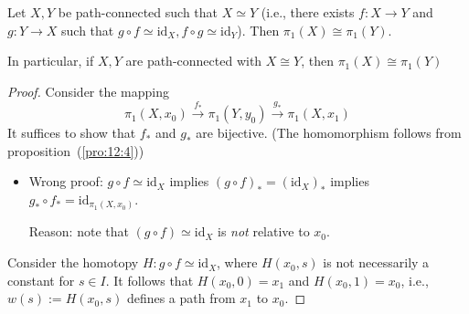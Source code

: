 \begin{proposition}\label{pro:12:5}
Let $X,Y$ be path-connected such that $X\simeq Y$ (i.e., there exists $f:X\to Y$ and $g:Y\to X$ such that $g\circ f\simeq\text{id}_X,f\circ g\simeq\text{id}_Y$).
Then $\pi_1(X)\cong\pi_1(Y)$.

In particular, if $X,Y$ are path-connected with $X\cong Y$, then $\pi_1(X)\cong\pi_1(Y)$
\end{proposition}
\begin{proof}
Consider the mapping
\[
\pi_1(X,x_0)\xrightarrow{f_*}\pi_1(Y,y_0)\xrightarrow{g_*}
\pi_1(X,x_1)
\]
It suffices to show that $f_*$ and $g_*$ are bijective. (The homomorphism follows from proposition~(\ref{pro:12:4}))
\begin{itemize}
\item
Wrong proof: $g\circ f\simeq\text{id}_X$ implies $(g\circ f)_*=(\text{id}_X)_*$ implies $g_*\circ f_*=\text{id}_{\pi_1(X,x_0)}$.

Reason: note that $(g\circ f)\simeq\text{id}_X$ is \emph{not} relative to $x_0$.
\end{itemize}

Consider the homotopy $H:g\circ f\simeq\text{id}_X$, where $H(x_0,s)$ is not necessarily a constant for $s\in I$.
It follows that $H(x_0,0)=x_1$ and $H(x_0,1)=x_0$, i.e., $w(s):=H(x_0,s)$ defines a path from $x_1$ to $x_0$.


\end{proof}
